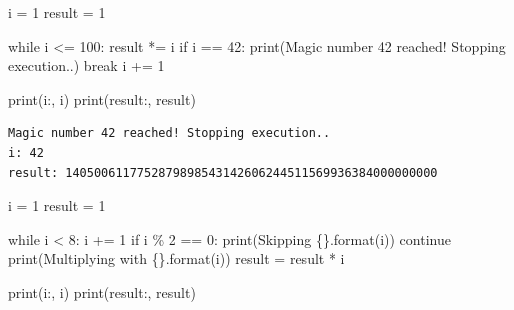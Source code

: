 \documentclass[
  letterpaper,
  DIV=11,
  numbers=noendperiod]{scrreprt}
\newenvironment{Shaded}{\begin{snugshade}}{\end{snugshade}}
\newcommand{\BuiltInTok}[1]{\textcolor[rgb]{0.00,0.23,0.31}{#1}}
\newcommand{\ControlFlowTok}[1]{\textcolor[rgb]{0.00,0.23,0.31}{#1}}
\newcommand{\DecValTok}[1]{\textcolor[rgb]{0.68,0.00,0.00}{#1}}
\newcommand{\NormalTok}[1]{\textcolor[rgb]{0.00,0.23,0.31}{#1}}
\newcommand{\OperatorTok}[1]{\textcolor[rgb]{0.37,0.37,0.37}{#1}}
\newcommand{\SpecialCharTok}[1]{\textcolor[rgb]{0.37,0.37,0.37}{#1}}
\newcommand{\StringTok}[1]{\textcolor[rgb]{0.13,0.47,0.30}{#1}}
\begin{document}
\begin{Shaded}
\begin{Highlighting}[]
\NormalTok{i }\OperatorTok{=} \DecValTok{1}
\NormalTok{result }\OperatorTok{=} \DecValTok{1}

\ControlFlowTok{while}\NormalTok{ i }\OperatorTok{\textless{}=} \DecValTok{100}\NormalTok{:}
\NormalTok{    result }\OperatorTok{*=}\NormalTok{ i}
    \ControlFlowTok{if}\NormalTok{ i }\OperatorTok{==} \DecValTok{42}\NormalTok{:}
        \BuiltInTok{print}\NormalTok{(}\StringTok{\textquotesingle{}Magic number 42 reached! Stopping execution..\textquotesingle{}}\NormalTok{)}
        \ControlFlowTok{break}
\NormalTok{    i }\OperatorTok{+=} \DecValTok{1}
    
\BuiltInTok{print}\NormalTok{(}\StringTok{\textquotesingle{}i:\textquotesingle{}}\NormalTok{, i)}
\BuiltInTok{print}\NormalTok{(}\StringTok{\textquotesingle{}result:\textquotesingle{}}\NormalTok{, result)}
\end{Highlighting}
\end{Shaded}

\begin{verbatim}
Magic number 42 reached! Stopping execution..
i: 42
result: 1405006117752879898543142606244511569936384000000000
\end{verbatim}

\begin{Shaded}
\begin{Highlighting}[]
\NormalTok{i }\OperatorTok{=} \DecValTok{1}
\NormalTok{result }\OperatorTok{=} \DecValTok{1}

\ControlFlowTok{while}\NormalTok{ i }\OperatorTok{\textless{}} \DecValTok{8}\NormalTok{:}
\NormalTok{    i }\OperatorTok{+=} \DecValTok{1}
    \ControlFlowTok{if}\NormalTok{ i }\OperatorTok{\%} \DecValTok{2} \OperatorTok{==} \DecValTok{0}\NormalTok{:}
        \BuiltInTok{print}\NormalTok{(}\StringTok{\textquotesingle{}Skipping }\SpecialCharTok{\{\}}\StringTok{\textquotesingle{}}\NormalTok{.}\BuiltInTok{format}\NormalTok{(i))}
        \ControlFlowTok{continue}
    \BuiltInTok{print}\NormalTok{(}\StringTok{\textquotesingle{}Multiplying with }\SpecialCharTok{\{\}}\StringTok{\textquotesingle{}}\NormalTok{.}\BuiltInTok{format}\NormalTok{(i))}
\NormalTok{    result }\OperatorTok{=}\NormalTok{ result }\OperatorTok{*}\NormalTok{ i}
    
\BuiltInTok{print}\NormalTok{(}\StringTok{\textquotesingle{}i:\textquotesingle{}}\NormalTok{, i)}
\BuiltInTok{print}\NormalTok{(}\StringTok{\textquotesingle{}result:\textquotesingle{}}\NormalTok{, result)}
\end{Highlighting}
\end{Shaded}
\end{document}
